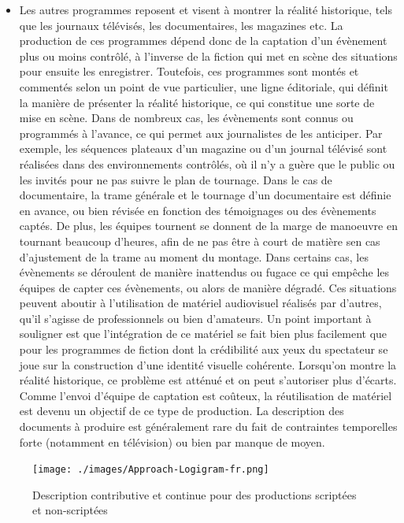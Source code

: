 \begin{itemize}
	\item Les autres programmes reposent et visent à montrer la réalité historique, tels que les journaux télévisés, les documentaires, les magazines etc.
	La production de ces programmes dépend donc de la captation d'un évènement plus ou moins contrôlé, à l'inverse de la fiction qui met en scène des situations pour ensuite les enregistrer.
	Toutefois, ces programmes sont montés et commentés selon un point de vue particulier, une ligne éditoriale, qui définit la manière de présenter la réalité historique, ce qui constitue une sorte de mise en scène.
	Dans de nombreux cas, les évènements sont connus ou programmés à l'avance, ce qui permet aux journalistes de les anticiper. 
	Par exemple, les séquences plateaux d'un magazine ou d'un journal télévisé sont réalisées dans des environnements contrôlés, où il n'y a guère que le public ou les invités pour ne pas suivre le plan de tournage.
	Dans le cas de documentaire, la trame générale et le tournage d'un documentaire est définie en avance, ou bien révisée en fonction des témoignages ou des évènements captés. 
	De plus, les équipes tournent se donnent de la marge de manoeuvre en tournant beaucoup d'heures, afin de ne pas être à court de matière sen cas d'ajustement de la trame au moment du montage.
	Dans certains cas, les évènements se déroulent de manière inattendus ou fugace ce qui empêche les équipes de capter ces évènements, ou alors de manière dégradé.
	Ces situations peuvent aboutir à l'utilisation de matériel audiovisuel réalisés par d'autres, qu'il s'agisse de professionnels ou bien d'amateurs.
	Un point important à souligner est que l'intégration de ce matériel se fait bien plus facilement que pour les programmes de fiction dont la crédibilité aux yeux du spectateur se joue sur la construction d'une identité visuelle cohérente. 
	Lorsqu'on montre la réalité historique, ce problème est atténué et on peut s'autoriser plus d'écarts.
	Comme l'envoi d'équipe de captation est coûteux, la réutilisation de matériel est devenu un objectif de ce type de production. 
	La description des documents à produire est généralement rare du fait de contraintes temporelles forte (notamment en télévision) ou bien par manque de moyen.
\end{itemize}


\begin{figure}[ht!]
\centering
\texttt{[image: ./images/Approach-Logigram-fr.png]}
\caption{Description contributive et continue pour des productions scriptées et non-scriptées}
\label{img:strat-annot}
\end{figure}

